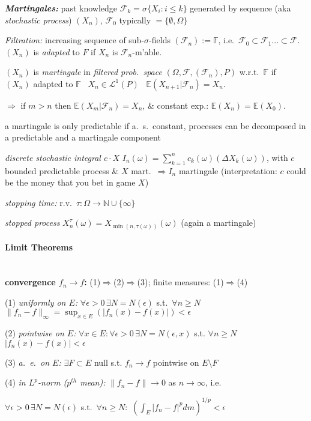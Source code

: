 \documentclass[8pt,twoside]{extarticle}
\begin{document}
\begin{multicols}{2}
\textit{\textbf{Martingales:}} past knowledge $\mathcal{F}_k{=}\sigma\{X_i:i{\leq} k\}$ generated by sequence (aka \textit{stochastic process}) $(X_n)$, $\mathcal{F}_0$ typically $=\{\emptyset, \Omega\}$

\textit{Filtration:} increasing sequence of sub-$\sigma$-fields $(\mathcal{F}_n):=\mathbb{F}$, i.e.\ $\mathcal{F}_0 \subset \mathcal{F}_1 ... \subset \mathcal{F}$. $(X_n)$ is \textit{adapted} to $F$ if $X_n$ is $\mathcal{F}_n$-m'able. 

$(X_n)$ is \textit{martingale} in \textit{filtered prob.\ space} $(\Omega,\mathcal{F}, (\mathcal{F}_n), P)$  w.r.t.\ $\mathbb{F}$ if \hspace{1em}\textbullet \ $(X_n)$ adapted to $\mathbb{F}$ \hspace{1em}\textbullet \ $X_n{\in} \mathcal{L}^1(P)$ \hspace{1em}\textbullet \ $\mathbb{E}(X_{n+1}|\mathcal{F}_n)=X_n$.

$\Rightarrow$ if $m{>}n$ then $\mathbb{E}(X_m|\mathcal{F}_n){=}X_n$, \& constant exp.: $\mathbb{E}(X_n){=}\mathbb{E}(X_0)$.

a martingale is only predictable if a.\ s.\ constant, processes can be decomposed in a predictable and a martingale component

\textit{discrete stochastic integral $c\cdot X$} $I_n(\omega)=\sum_{k=1}^nc_k(\omega)(\Delta X_k(\omega))$, with $c$ bounded predictable process \& $X$ mart.\ $\Rightarrow I_n$ martingale (interpretation: $c$ could be the money that you bet in game $X$)

\textit{stopping time:} r.v.\ $\tau: \Omega \to \mathbb{N}\cup \{\infty\}$ 

\textit{stopped process} $X^\tau_n(\omega)=X_{\min(n,\tau(\omega))}(\omega)$ (again a martingale)


\paragraph{Limit Theorems} \ \\

\textbf{convergence $f_n{\to} f$:} (1)$\Rightarrow$(2)$\Rightarrow$(3);  finite measures: (1)$\Rightarrow$(4) 

(1) \textit{uniformly on $E$:} $\forall \epsilon{>}0\,\exists N{=}N(\epsilon)$ s.t.\ $\forall n\geq N$ $\|f_n - f\|_{\infty}= \sup_{x\in E}(|f_n(x)-f(x)|) < \epsilon$ 

(2) \textit{pointwise on $E$:} $\forall x\in E: \forall \epsilon{>}0\,\exists N{=}N(\epsilon,x)$ s.t. $ \forall n\geq N$  $|f_n(x)-f(x)|<\epsilon$

(3) \textit{a.\ e.\ on $E$:} $\exists F\subset E$ null s.t. $f_n \to f$ pointwise on $E\setminus F$

(4) \textit{in $L^p$-norm ($p^{th}$ mean):} $\|f_n-f\|\to 0$ as $n\to \infty$, i.e.\

$\forall \epsilon{>}0\,\exists N{=}N(\epsilon)$ s.t.\ $\forall n\geq N:$ $\left(\int_E|f_n-f|^pdm\right)^{1/p} <\epsilon$

\end{multicols}
\end{document}
